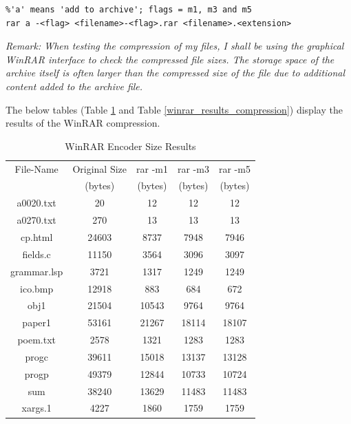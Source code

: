 \documentclass[12pt]{article}
\begin{document}
\begin{verbatim}
%'a' means 'add to archive'; flags = m1, m3 and m5
rar a -<flag> <filename>-<flag>.rar <filename>.<extension>
\end{verbatim}

\emph{Remark: When testing the compression of my files, I shall be using the graphical WinRAR interface to check the compressed file sizes. The storage space of the archive itself is often larger than the compressed size of the file due to additional content added to the archive file.}

The below tables (Table \ref{winrar_results_size} and Table \ref{winrar_results_compression}) display the results of the WinRAR compression.

\begin{table}[H]
	\centering
	\begin{tabular}{| c | c | c | c | c |} 
		\hline
		File-Name & Original Size & rar -m1 & rar -m3 & rar -m5 \\
		& (bytes) & (bytes) & (bytes) & (bytes) \\
		\hline
		a0020.txt & 20 & 12 & 12 & 12\\
		\hline
		a0270.txt & 270 & 13 & 13 & 13\\
		\hline
		cp.html & 24603 & 8737 & 7948 & 7946\\
		\hline
		fields.c & 11150 & 3564 & 3096 & 3097\\
		\hline
		grammar.lsp & 3721 & 1317 & 1249 & 1249\\
		\hline
		ico.bmp & 12918 & 883 & 684 & 672\\
		\hline
		obj1 & 21504 & 10543 & 9764 & 9764\\
		\hline
		paper1 & 53161 & 21267 & 18114 & 18107\\
		\hline
		poem.txt & 2578 & 1321 & 1283 & 1283\\
		\hline
		progc & 39611 & 15018 & 13137 & 13128\\
		\hline
		progp & 49379 & 12844 & 10733 & 10724\\
		\hline
		sum & 38240 & 13629 & 11483 & 11483\\
		\hline
		xargs.1 & 4227 & 1860 & 1759 & 1759\\
		\hline
	\end{tabular}
	\caption{WinRAR Encoder Size Results}
	\label{winrar_results_size}
\end{table}
\end{document}
